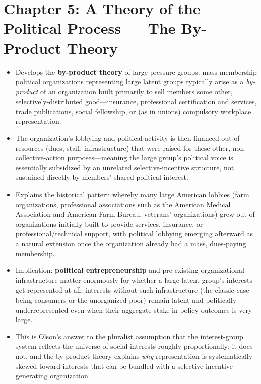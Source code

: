 \documentclass[12pt]{article}
\begin{document}
\section{Chapter 5: A Theory of the Political Process --- The By-Product Theory}

\begin{itemize}[leftmargin=*, itemsep=4pt]
    \item Develops the \textbf{by-product theory} of large pressure groups: mass-membership political organizations representing large latent groups typically arise as a \emph{by-product} of an organization built primarily to sell members some other, selectively-distributed good---insurance, professional certification and services, trade publications, social fellowship, or (as in unions) compulsory workplace representation.
    \item The organization's lobbying and political activity is then financed out of resources (dues, staff, infrastructure) that were raised for these other, non-collective-action purposes---meaning the large group's political voice is essentially subsidized by an unrelated selective-incentive structure, not sustained directly by members' shared political interest.
    \item Explains the historical pattern whereby many large American lobbies (farm organizations, professional associations such as the American Medical Association and American Farm Bureau, veterans' organizations) grew out of organizations initially built to provide services, insurance, or professional/technical support, with political lobbying emerging afterward as a natural extension once the organization already had a mass, dues-paying membership.
    \item Implication: \textbf{political entrepreneurship} and pre-existing organizational infrastructure matter enormously for whether a large latent group's interests get represented at all; interests without such infrastructure (the classic case being consumers or the unorganized poor) remain latent and politically underrepresented even when their aggregate stake in policy outcomes is very large.
    \item This is Olson's answer to the pluralist assumption that the interest-group system reflects the universe of social interests roughly proportionally: it does not, and the by-product theory explains \emph{why} representation is systematically skewed toward interests that can be bundled with a selective-incentive-generating organization.
\end{itemize}
\end{document}
